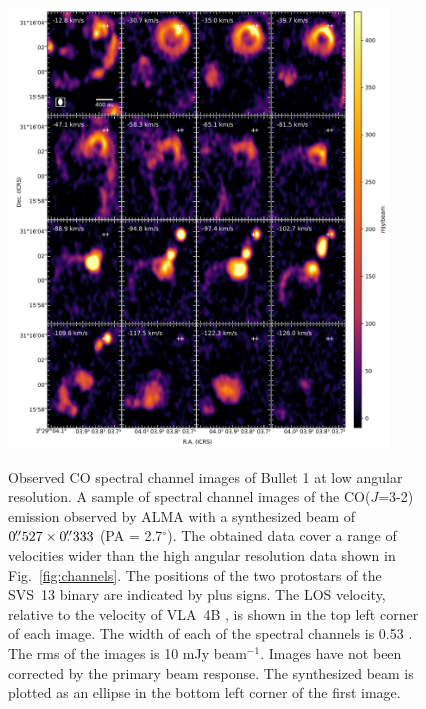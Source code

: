 \documentclass[12pt]{mythesis}
\begin{document}
\begin{figure}[p!] 
\begin{center}
\includegraphics[width=0.90\textwidth]{figures/channels_lr.pdf}\\
\caption[Selection of high resolution channel maps]{
Observed CO spectral channel images of Bullet 1 at low angular resolution. A sample of spectral channel images of the CO($J$=3-2) emission observed by ALMA with a synthesized beam of $0\mbox{$.\!\!^{\prime\prime}$}527 \times 0\mbox{$.\!\!^{\prime\prime}$}333$ (PA = 2.7$^\circ$). The obtained data cover a range of velocities wider than the high angular resolution data shown in Fig.~\ref{fig:channels}. The positions of the two protostars of the SVS~13 binary \citep{anglada2000} are indicated by plus signs. The LOS velocity, relative to the velocity of VLA~4B \citep[$V_{\rm LSR}$ = +9.3 \kms;][]{diaz-rodriguez2022}, is shown in the top left corner of each image. The width of each of the spectral channels is 0.53 \kms. The rms of the images is 10 mJy beam$^{-1}$. Images have not been corrected by the primary beam response. The synthesized beam is plotted as an ellipse in the bottom left corner of the first image.
 \label{fig:lowres}}
 \end{center}
\end{figure}
\end{document}
